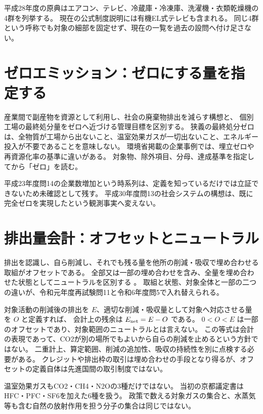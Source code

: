 \begin{tcolorbox}[title=出題当時と現在の対象]
平成28年度の原典はエアコン、テレビ、冷蔵庫・冷凍庫、洗濯機・衣類乾燥機の4群を列挙する。
現在の公式制度説明には有機EL式テレビも含まれる\cite{env_appliance2024}。
同じ4群という呼称でも対象の細部を固定せず、現在の一覧を過去の設問へ付け足さない。
\end{tcolorbox}

\section{ゼロエミッション：ゼロにする量を指定する}
\label{theory:environment:zero}
産業間で副産物を資源として利用し、社会の廃棄物排出を減らす構想と、
個別工場の最終処分量をゼロへ近づける管理目標を区別する。
狭義の最終処分ゼロは、全物質が工場から出ないこと、温室効果ガスが一切出ないこと、エネルギー投入が不要であることを意味しない。
環境省掲載の企業事例では、埋立ゼロや再資源化率の基準に違いがある\cite{env_zero2008}。
対象物、除外項目、分母、達成基準を指定してから「ゼロ」を読む。

平成23年度問14の企業数増加という時系列は、定義を知っているだけでは立証できないため未確認として残す。
平成30年度問13の社会システムの構想は、既に完全ゼロを実現したという観測事実へ変えない。

\section{排出量会計：オフセットとニュートラル}
\label{theory:environment:carbon}
排出を認識し、自ら削減し、それでも残る量を他所の削減・吸収で埋め合わせる取組がオフセットである。
全部又は一部の埋め合わせを含み、全量を埋め合わせた状態としてニュートラルを区別する
\cite{env_offset2008,env_offset_guideline,env_neutral2011}。
取組と状態、対象全体と一部の二つの違いが、令和元年度再試験問11と令和6年度問5で入れ替えられる。

対象活動の削減後の排出を \(E\)、適切な削減・吸収量として対象へ対応させる量を \(O\) と定義すれば、
会計上の残余は \(E_{\rm net}=E-O\) である。
\(0<O<E\) は一部のオフセットであり、対象範囲のニュートラルとは言えない。
この等式は会計の表現であって、CO2が別の場所でもよいから自らの削減を止めるという方針ではない。
二重計上、算定範囲、削減の追加性、吸収の持続性を別に点検する必要がある。
クレジットや排出枠の取引は埋め合わせの手段となり得るが、オフセットの定義自体は先進国間の取引制度ではない。

温室効果ガスもCO2・CH4・N2Oの3種だけではない。
当初の京都議定書はHFC・PFC・SF6を加えた6種を扱う\cite{env_kyoto2005}。
政策で数える対象ガスの集合と、水蒸気等も含む自然の放射作用を担う分子の集合は同じではない。

